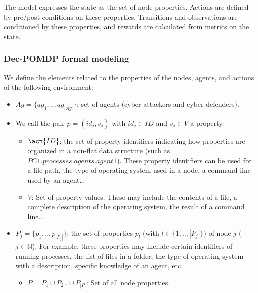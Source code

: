 \noindent
The  model expresses the state as the set of node properties. Actions are defined by pre/post-conditions on these properties. Transitions and observations are conditioned by these properties, and rewards are calculated from metrics on the state.

\subsubsection{Dec-POMDP formal modeling}

We define the elements related to the properties of the nodes, agents, and actions of the following environment:

\begin{itemize}

\item $Ag = \{ag_1,..,ag_{|Ag|}\}$: set of agents (cyber attackers and cyber defenders).

\item We call the pair $p = (id_{j}, v_{j})$ with $id_j \in {ID}$ and $v_j \in V$ a property.
\begin{itemize}
\item $\acn{ID}$: the set of property identifiers indicating how properties are organized in a non-flat data structure (such as $PC1.processes.agents.agent1$). These property identifiers can be used for a file path, the type of operating system used in a node, a command line used by an agent\dots
\item $V$: Set of property values. These may include the contents of a file, a complete description of the operating system, the result of a command line\dots
\end {itemize}

\item $P_{j} = \{ p_1, .., p_{|P_{j}|} \}$: the set of properties $p_{l}$ (with $l \in \{1,..,|P_{j}|\}$) of node $j$ ($j \in \mathbb{N} $). For example, these properties may include certain identifiers of running processes, the list of files in a folder, the type of operating system with a description, specific knowledge of an agent, etc.
\begin{itemize}
\item $P = P_1 \cup P_2 .. \cup P_{|P|} $: Set of all node properties.
\end {itemize}


\end{itemize}

